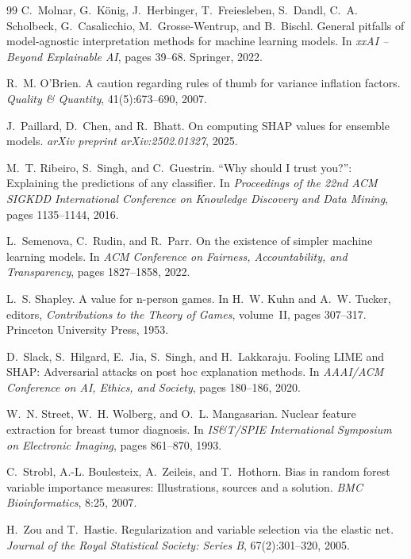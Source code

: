 \documentclass[10pt]{article}
\begin{document}
\begin{thebibliography}{99}
C.~Molnar, G.~K{\"o}nig, J.~Herbinger, T.~Freiesleben, S.~Dandl,
  C.~A. Scholbeck, G.~Casalicchio, M.~Grosse-Wentrup, and B.~Bischl.
\newblock General pitfalls of model-agnostic interpretation methods for
  machine learning models.
\newblock In \emph{xxAI -- Beyond Explainable AI}, pages 39--68. Springer,
  2022.

R.~M. O'Brien.
\newblock A caution regarding rules of thumb for variance inflation factors.
\newblock \emph{Quality \& Quantity}, 41(5):673--690, 2007.

J.~Paillard, D.~Chen, and R.~Bhatt.
\newblock On computing {SHAP} values for ensemble models.
\newblock \emph{arXiv preprint arXiv:2502.01327}, 2025.

M.~T. Ribeiro, S.~Singh, and C.~Guestrin.
\newblock ``{W}hy should {I} trust you?'': Explaining the predictions of any
  classifier.
\newblock In \emph{Proceedings of the 22nd ACM SIGKDD International Conference
  on Knowledge Discovery and Data Mining}, pages 1135--1144, 2016.

L.~Semenova, C.~Rudin, and R.~Parr.
\newblock On the existence of simpler machine learning models.
\newblock In \emph{ACM Conference on Fairness, Accountability, and
  Transparency}, pages 1827--1858, 2022.

L.~S. Shapley.
\newblock A value for n-person games.
\newblock In H.~W. Kuhn and A.~W. Tucker, editors, \emph{Contributions to the
  Theory of Games}, volume~II, pages 307--317. Princeton University Press, 1953.

D.~Slack, S.~Hilgard, E.~Jia, S.~Singh, and H.~Lakkaraju.
\newblock Fooling {LIME} and {SHAP}: Adversarial attacks on post hoc
  explanation methods.
\newblock In \emph{AAAI/ACM Conference on AI, Ethics, and Society}, pages
  180--186, 2020.

W.~N. Street, W.~H. Wolberg, and O.~L. Mangasarian.
\newblock Nuclear feature extraction for breast tumor diagnosis.
\newblock In \emph{IS\&T/SPIE International Symposium on Electronic Imaging},
  pages 861--870, 1993.

C.~Strobl, A.-L. Boulesteix, A.~Zeileis, and T.~Hothorn.
\newblock Bias in random forest variable importance measures: Illustrations,
  sources and a solution.
\newblock \emph{BMC Bioinformatics}, 8:25, 2007.

H.~Zou and T.~Hastie.
\newblock Regularization and variable selection via the elastic net.
\newblock \emph{Journal of the Royal Statistical Society: Series B},
  67(2):301--320, 2005.

\end{thebibliography}
\end{document}
